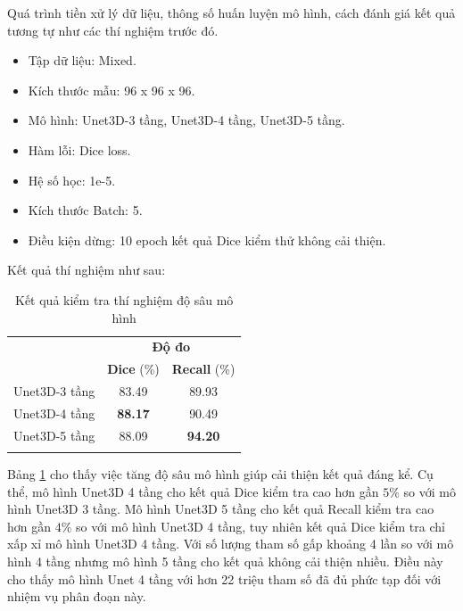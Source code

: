 Quá trình tiền xử lý dữ liệu, thông số huấn luyện mô hình, cách đánh giá kết quả tương tự như các thí nghiệm trước đó.

\begin{itemize}
    \item Tập dữ liệu: Mixed.
    \item Kích thước mẫu: 96 x 96 x 96.
    \item Mô hình: Unet3D-3 tầng, Unet3D-4 tầng, Unet3D-5 tầng.
    \item Hàm lỗi: Dice loss.
    \item Hệ số học: 1e-5.
    \item Kích thước Batch: 5.
    \item Điều kiện dừng: 10 epoch kết quả Dice kiểm thử không cải thiện.
\end{itemize}

Kết quả thí nghiệm như sau:
\begin{table}[H]
\renewcommand{\arraystretch}{1.2}
\centering
\begin{tabular}{c|c|c}
\Xhline{3\arrayrulewidth}
\multirow{2}{*}{\textbf{Thí nghiệm}} & \multicolumn{2}{c}{\textbf{Độ đo}}        \\ \cline{2-3} 
                                     & \textbf{Dice} (\%) & \textbf{Recall} (\%) \\ \hline
Unet3D-3 tầng       & 83.49          & 89.93          \\ \hline
Unet3D-4 tầng       & \textbf{88.17} & 90.49          \\ \hline
Unet3D-5 tầng       & 88.09 & \textbf{94.20}          \\ 
\Xhline{3\arrayrulewidth}
\end{tabular}
\caption{Kết quả kiểm tra thí nghiệm độ sâu mô hình}
\label{tab:deep-model-result}
\end{table}

Bảng \ref{tab:deep-model-result} cho thấy việc tăng độ sâu mô hình giúp cải thiện kết quả đáng kể. Cụ thể, mô hình Unet3D 4 tầng cho kết quả Dice kiểm tra cao hơn gần $5\%$ so với mô hình Unet3D 3 tầng. Mô hình Unet3D 5 tầng cho kết quả Recall kiểm tra cao hơn gần $4\%$ so với mô hình Unet3D 4 tầng, tuy nhiên kết quả Dice kiểm tra chỉ xấp xỉ mô hình Unet3D 4 tầng. Với số lượng tham số gấp khoảng 4 lần so với mô hình 4 tầng nhưng mô hình 5 tầng cho kết quả không cải thiện nhiều. Điều này cho thấy mô hình Unet 4 tầng với hơn 22 triệu tham số đã đủ phức tạp đối với nhiệm vụ phân đoạn này.\par


